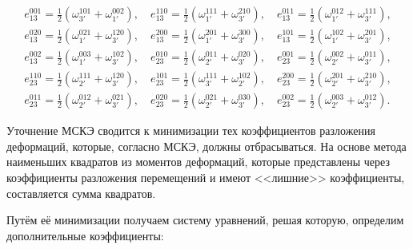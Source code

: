 \begin{gather}
e_{13}^{001}=\frac{1}{2}(\omega_{3'}^{101}+\omega_{1'}^{002}), \quad 

e_{13}^{110}=\frac{1}{2}(\omega_{1'}^{111}+\omega_{3'}^{210}), \quad 

e_{13}^{011}=\frac{1}{2}(\omega_{1'}^{012}+\omega_{3'}^{111}),

\\

e_{13}^{020}=\frac{1}{2}(\omega_{1'}^{021}+\omega_{3'}^{120}), \quad  

e_{13}^{200}=\frac{1}{2}(\omega_{1'}^{201}+\omega_{3'}^{300}), \quad  

e_{13}^{101}=\frac{1}{2}(\omega_{1'}^{102}+\omega_{3'}^{201}),

\\

e_{13}^{002}=\frac{1}{2}(\omega_{1'}^{003}+\omega_{3'}^{102}), \quad  

e_{23}^{010}=\frac{1}{2}(\omega_{2'}^{011}+\omega_{3'}^{020}), \quad  

e_{23}^{001}=\frac{1}{2}(\omega_{2'}^{002}+\omega_{3'}^{011}),

\\

e_{23}^{110}=\frac{1}{2}(\omega_{2'}^{111}+\omega_{3'}^{120}), \quad  

e_{23}^{101}=\frac{1}{2}(\omega_{3'}^{111}+\omega_{2'}^{102}), \quad  

e_{23}^{200}=\frac{1}{2}(\omega_{2'}^{201}+\omega_{3'}^{210}),

\\

e_{23}^{011}=\frac{1}{2}(\omega_{2'}^{012}+\omega_{3'}^{021}), \quad  

e_{23}^{020}=\frac{1}{2}(\omega_{2'}^{021}+\omega_{3'}^{030}), \quad  

e_{23}^{002}=\frac{1}{2}(\omega_{2'}^{003}+\omega_{3'}^{012}).

\end{gather}



Уточнение МСКЭ сводится к минимизации тех коэффициентов разложения деформаций, которые, согласно МСКЭ, должны отбрасываться. На основе метода наименьших квадратов из моментов деформаций, которые представлены через коэффициенты разложения перемещений и имеют <<лишние>> коэффициенты, составляется сумма квадратов. 

Путём её минимизации получаем систему уравнений, решая которую, определим дополнительные коэффициенты:

